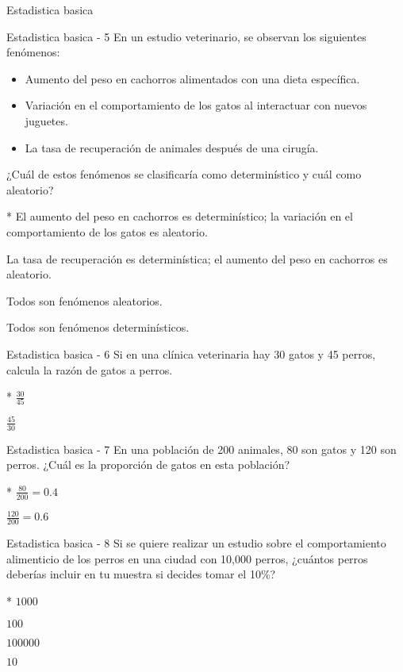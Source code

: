 \documentclass[a4,11pt]{aleph-notas}
\begin{document}
\begin{quiz}{Estadistica basica}
\begin{multi}%
    {Estadistica basica - 5}
    En un estudio veterinario, se observan los siguientes fenómenos:
    \begin{itemize}
    	\item  Aumento del peso en cachorros alimentados con una dieta específica.
    	\item Variación en el comportamiento de los gatos al interactuar con nuevos juguetes.
    	\item La tasa de recuperación de animales después de una cirugía.
    \end{itemize}
    ¿Cuál de estos fenómenos se clasificaría como determinístico y cuál como aleatorio?
    \item[]* El aumento del peso en cachorros es determinístico; la variación en el comportamiento de los gatos es aleatorio.
    \item[] La tasa de recuperación es determinística; el aumento del peso en cachorros es aleatorio.
    \item[] Todos son fenómenos aleatorios.
    \item[] Todos son fenómenos determinísticos.
\end{multi}

\begin{multi}%
    {Estadistica basica - 6}
    Si en una clínica veterinaria hay 30 gatos y 45 perros, calcula la razón de gatos a perros.
    \item[]* $\frac{30}{45}$
    \item[] $\frac{45}{30}$
\end{multi}

\begin{multi}%
    {Estadistica basica - 7}
    En una población de 200 animales, 80 son gatos y 120 son perros. ¿Cuál es la proporción de gatos en esta población?
    \item[]* $\frac{80}{200} = 0.4$
    \item[] $\frac{120}{200} = 0.6$
\end{multi}

\begin{multi}%
    {Estadistica basica - 8}
    Si se quiere realizar un estudio sobre el comportamiento alimenticio de los perros en una ciudad con 10,000 perros, ¿cuántos perros deberías incluir en tu muestra si decides tomar el 10\%?
    \item[]* $1000$
    \item[] $100$
    \item[] $100000$
    \item[] $10$
\end{multi}


\end{quiz}
\end{document}
